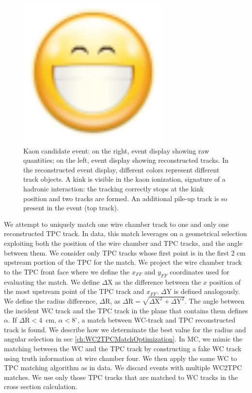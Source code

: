 \begin{figure}
  \centering  
\includegraphics[width=3in]{Chapter-4/Images/face-smile-big.png}
\caption{Kaon candidate event: on the right, event display showing raw quantities; on the left, event display showing reconstructed tracks. In the reconstructed event display, different colors represent different track objects. A kink is visible in the kaon ionization, signature of a hadronic interaction: the tracking correctly stops at the kink position and two tracks are formed. An additional pile-up track is so present in the event (top track).}
\label{fig:kaonInteraction}
\end{figure}



We attempt to uniquely match one wire chamber track to one and only one reconstructed TPC track. In data, this match leverages on a geometrical selection exploiting both the position of the wire chamber and TPC tracks, and the angle between them. We consider only TPC tracks whose first point is in the first 2 cm upstream portion of the TPC for the match.  We project the wire chamber track to the TPC front face where we define the $x_{FF}$ and $y_{FF}$ coordinates used for evaluating the match.  We define $\Delta$X as the difference between the $x$ position of the most upstream point of the TPC track and $x_{FF}$.  $\Delta$Y is defined analogously. We define the radius difference, $\Delta$R, as $ \Delta \text{R} =  \sqrt{ \Delta \text{X}^2 +  \Delta \text{Y}^2}  $. The angle between the incident WC track and the TPC track in the plane that contains them defines $\alpha$.  If  $\Delta \text{R} < 4 $~cm, $\alpha < 8^\circ $,  a match between WC-track and TPC reconstructed track is found. We describe  how we determinate the best value for the radius and angular selection in sec \ref{ch:WC2TPCMatchOptimization}.
In MC, we mimic the matching between the WC and the TPC track by constructing a fake WC track using truth information at wire chamber four. We then apply the same WC to TPC matching algorithm as in data. 
We discard events with multiple WC2TPC matches. We use only those TPC tracks that are matched to WC tracks in the cross section calculation.



